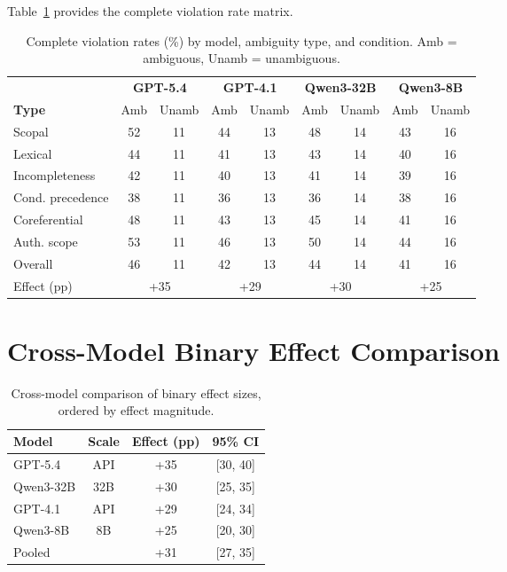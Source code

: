\documentclass[11pt,a4paper]{article}
\begin{document}
Table~\ref{tab:full_results_app} provides the complete violation rate matrix.

\begin{table}[t]
\centering
\small
\caption{Complete violation rates (\%) by model, ambiguity type, and condition. Amb = ambiguous, Unamb = unambiguous.}
\label{tab:full_results_app}
\begin{tabular}{lcccccccc}
\toprule
& \multicolumn{2}{c}{\textbf{GPT-5.4}} & \multicolumn{2}{c}{\textbf{GPT-4.1}} & \multicolumn{2}{c}{\textbf{Qwen3-32B}} & \multicolumn{2}{c}{\textbf{Qwen3-8B}} \\
\cmidrule(lr){2-3} \cmidrule(lr){4-5} \cmidrule(lr){6-7} \cmidrule(lr){8-9}
\textbf{Type} & Amb & Unamb & Amb & Unamb & Amb & Unamb & Amb & Unamb \\
\midrule
Scopal & 52 & 11 & 44 & 13 & 48 & 14 & 43 & 16 \\
Lexical & 44 & 11 & 41 & 13 & 43 & 14 & 40 & 16 \\
Incompleteness & 42 & 11 & 40 & 13 & 41 & 14 & 39 & 16 \\
Cond. precedence & 38 & 11 & 36 & 13 & 36 & 14 & 38 & 16 \\
Coreferential & 48 & 11 & 43 & 13 & 45 & 14 & 41 & 16 \\
Auth. scope & 53 & 11 & 46 & 13 & 50 & 14 & 44 & 16 \\
\midrule
Overall & 46 & 11 & 42 & 13 & 44 & 14 & 41 & 16 \\
Effect (pp) & \multicolumn{2}{c}{+35} & \multicolumn{2}{c}{+29} & \multicolumn{2}{c}{+30} & \multicolumn{2}{c}{+25} \\
\bottomrule
\end{tabular}
\end{table}

\section{Cross-Model Binary Effect Comparison}
\label{app:cross_model}

\begin{table}[t]
\centering
\small
\caption{Cross-model comparison of binary effect sizes, ordered by effect magnitude.}
\label{tab:cross_model}
\begin{tabular}{lccc}
\toprule
\textbf{Model} & \textbf{Scale} & \textbf{Effect (pp)} & \textbf{95\% CI} \\
\midrule
GPT-5.4 & API & +35 & {[}30, 40{]} \\
Qwen3-32B & 32B & +30 & {[}25, 35{]} \\
GPT-4.1 & API & +29 & {[}24, 34{]} \\
Qwen3-8B & 8B & +25 & {[}20, 30{]} \\
\midrule
\multicolumn{2}{l}{Pooled} & +31 & {[}27, 35{]} \\
\bottomrule
\end{tabular}
\end{table}
\end{document}
